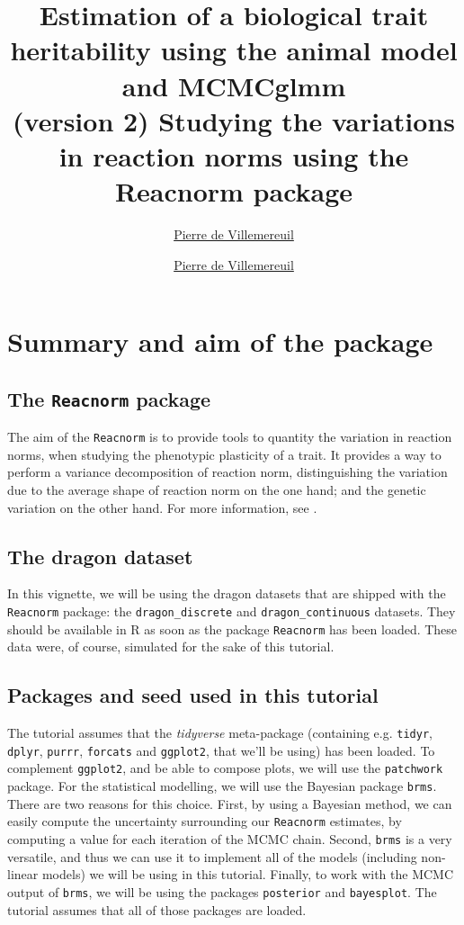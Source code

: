 \documentclass[a4paper,12pt,twoside]{article}
\title{
  \tcbox[colback=themecolor,colframe=themecolor]{\color{white}Tutorial} 
  Estimation of a biological trait heritability using the animal model and MCMCglmm\\
  \large{(version 2)}
}
\author[Pierre de Villemereuil]{\href{mailto:pierre.de-villemereuil@mnhn.fr}{Pierre de Villemereuil}}
\author{\href{mailto:pierre.de-villemereuil@mnhn.fr}{Pierre de Villemereuil}}
\title{Studying the variations in reaction norms using the Reacnorm package}
\begin{document}
\maketitle

\tableofcontents

\newpage

\section{Summary and aim of the package}

\subsection{The \texttt{Reacnorm} package}

The aim of the \texttt{Reacnorm} is to provide tools to quantity the variation in reaction norms, when studying the phenotypic plasticity of a trait. It provides a way to perform a variance decomposition of reaction norm, distinguishing the variation due to the average shape of reaction norm on the one hand; and the genetic variation on the other hand. For more information, see \textcite{devillemereuil_partitioning_2025}.

\subsection{The dragon dataset}

In this vignette, we will be using the dragon datasets that are shipped with the \texttt{Reacnorm} package: the \texttt{dragon\_discrete} and \texttt{dragon\_continuous} datasets. They should be available in R as soon as the package \texttt{Reacnorm} has been loaded.
These data were, of course, simulated for the sake of this tutorial.

\subsection{Packages and seed used in this tutorial}

The tutorial assumes that the \textit{tidyverse} meta-package (containing e.g. \texttt{tidyr}, \texttt{dplyr}, \texttt{purrr}, \texttt{forcats} and \texttt{ggplot2}, that we'll be using) has been loaded.
To complement \texttt{ggplot2}, and be able to compose plots, we will use the \texttt{patchwork} package. For the statistical modelling, we will use the Bayesian package \texttt{brms}. 
There are two reasons for this choice. First, by using a Bayesian method, we can easily compute the uncertainty surrounding our \texttt{Reacnorm} estimates, by computing a value for each iteration of the MCMC chain. Second, \texttt{brms} is a very versatile, and thus we can use it to implement all of the models (including non-linear models) we will be using in this tutorial.
Finally, to work with the MCMC output of \texttt{brms}, we will be using the packages \texttt{posterior} and \texttt{bayesplot}.
The tutorial assumes that all of those packages are loaded.
\end{document}
